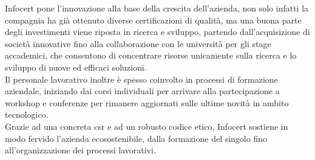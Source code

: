 Infocert pone l'innovazione alla base della crescita dell'azienda, non solo infatti la compagnia ha già ottenuto diverse certificazioni di qualità, ma una buona parte degli investimenti viene riposta in ricerca e sviluppo, partendo dall'acquisizione di società innovative fino alla collaborazione con le università per gli stage accademici, che consentono di concentrare risorse unicamente sulla ricerca e lo sviluppo di nuove ed efficaci soluzioni. \\
Il personale lavorativo inoltre è spesso coinvolto in processi di formazione aziendale, iniziando dai corsi individuali per arrivare alla partecipazione a workshop e conferenze per rimanere aggiornati sulle ultime novità in ambito tecnologico. \\
Grazie ad una concreta \gls{csr} e ad un robusto codice etico, Infocert sostiene in modo fervido l'azienda ecosostenibile, dalla formazione del singolo fino all'organizzazione dei processi lavorativi.